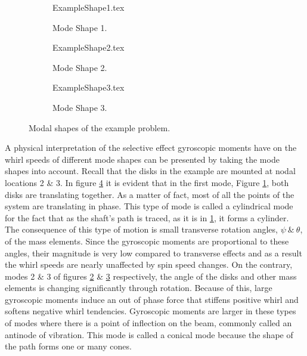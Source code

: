 \begin{figure}[h!]
	\def\cs{.315}	
	\def\overlap{1em}
\begin{subfigure}{\cs\textwidth}
	\centering
	\def\width{\linewidth+\overlap}
	\def\height{\linewidth}
	{ExampleShape1.tex}
	\caption{Mode Shape 1.}
	\label{fig:ExampleShape1}
\end{subfigure}
\begin{subfigure}{\cs\textwidth}
	\centering
	\def\width{\linewidth+\overlap}
	\def\height{\linewidth}
	{ExampleShape2.tex}
	\caption{Mode Shape 2.}
	\label{fig:ExampleShape2}
\end{subfigure}
\begin{subfigure}{\cs\textwidth}
	\centering
	\def\width{\linewidth+\overlap}
	\def\height{\linewidth}
	{ExampleShape3.tex}
	\caption{Mode Shape 3.}
	\label{fig:ExampleShape3}
\end{subfigure}
\caption{Modal shapes of the example problem.}\label{fig:ExampleShape}
\end{figure}
 A physical interpretation of the selective effect gyroscopic moments have on the whirl speeds of different mode shapes can be presented by taking the mode shapes into account. Recall that the disks in the example are mounted at nodal locations 2 \& 3. In figure \ref{fig:ExampleShape} it is evident that in the first mode, Figure \ref{fig:ExampleShape1}, both disks are translating together. As a matter of fact, most of all the points of the system are translating in phase. This type of mode is called a cylindrical mode for the fact that as the shaft's path is traced, as it is in \ref{fig:ExampleShape1}, it forms a cylinder. The consequence of this type of motion is small transverse rotation angles, $ \psi\ \&\ \theta $, of the mass elements. Since the gyroscopic moments are proportional to these angles, their magnitude is very low compared to transverse effects and as a result the whirl speeds are nearly unaffected by spin speed changes. On the contrary, modes 2 \& 3 of figures \ref{fig:ExampleShape2} \& \ref{fig:ExampleShape3} respectively, the angle of the disks and other mass elements is changing significantly through rotation. Because of this, large gyroscopic moments induce an out of phase force that stiffens positive whirl and softens negative whirl tendencies. Gyroscopic moments are larger in these types of modes where there is a point of inflection on the beam, commonly called an antinode of vibration. This mode is called a conical mode because the shape of the path forms one or many cones.\par